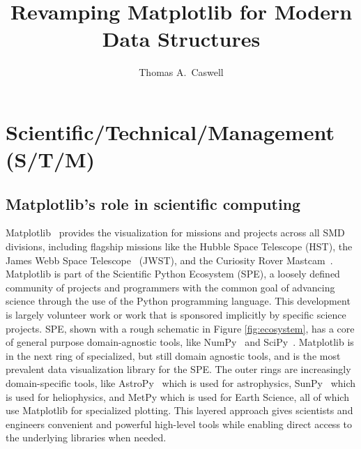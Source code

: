 \documentclass[12pt]{article}
\numberwithin{page}{section}
\begin{document}
\title{Revamping Matplotlib for Modern Data Structures}
\author{Thomas A.\ Caswell}
\date{}
\maketitle

\setcounter{tocdepth}{2}
\tableofcontents
\thispagestyle{empty}
\newpage

\section{Scientific/Technical/Management (S/T/M)}
\setcounter{page}{1}

\subsection{Matplotlib's role in scientific computing}

Matplotlib~\cite{Hunter:2007} provides the visualization for missions
and projects across all SMD divisions, including flagship
missions like the Hubble Space Telescope (HST), the James Webb Space
Telescope~\cite{jwst_pipeline} (JWST), and the Curiosity Rover
Mastcam~\cite{https://doi.org/10.1002/2016EA000219}.  Matplotlib is
part of the Scientific Python Ecosystem (SPE), a loosely defined
community of projects and programmers with the common goal of
advancing science through the use of the Python programming language.
This development is largely volunteer work or work that is sponsored
implicitly by specific science projects.  SPE, shown with a rough
schematic in Figure \ref{fig:ecosystem}, has a core of general purpose
domain-agnostic tools, like NumPy~\cite{Harris2020} and
SciPy~\cite{Virtanen2020}. Matplotlib is in the next ring of
specialized, but still domain agnostic tools, and is the most
prevalent data visualization library for the SPE.  The outer rings are
increasingly domain-specific tools, like
AstroPy~\cite{robitaille2013astropy} which is used for astrophysics,
SunPy~\cite{sunpy_community2020} which is used for heliophysics, and
MetPy which is used for Earth Science, all of which use Matplotlib for
specialized plotting.  This layered approach gives scientists and
engineers convenient and powerful high-level tools while enabling
direct access to the underlying libraries when needed.
\end{document}
